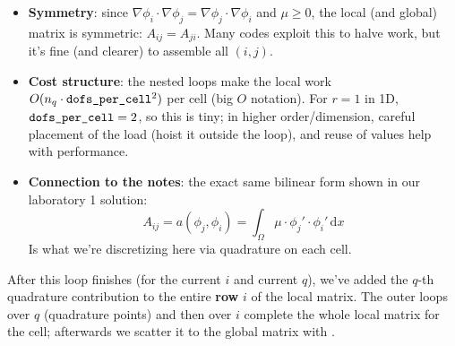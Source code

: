 \begin{itemize}
\begin{itemize}
        \item \textbf{Symmetry}: since $\nabla\phi_i\cdot\nabla\phi_j = \nabla\phi_j\cdot\nabla\phi_i$ and $\mu\ge 0$, the local (and global) matrix is symmetric: $A_{ij}=A_{ji}$. Many codes exploit this to halve work, but it's fine (and clearer) to assemble all $(i,j)$.

        \item \textbf{Cost structure}: the nested  loops make the local work $O(n_q \cdot \texttt{dofs\_per\_cell}^2)$ per cell (big $O$ notation). For $r=1$ in 1D, $\code{dofs\_}\break\code{per\_cell}=2$, so this is tiny; in higher order/dimension, careful placement of the  load (hoist it outside the  loop), and reuse of  values help with performance.
        
        \item \textbf{Connection to the notes}: the exact same bilinear form shown in our laboratory 1 solution:
        \begin{equation*}
            A_{ij} = a\left(\phi_j,\phi_i\right)=\displaystyle\int_{\Omega} \mu \cdot \phi_{j}' \cdot \phi_{i}'\,\mathrm{d}x
        \end{equation*}
        Is what we're discretizing here via quadrature on each cell.
    \end{itemize}
    After this  loop finishes (for the current $i$ and current $q$), we've added the $q$-th quadrature contribution to the entire \textbf{row} $i$ of the local matrix. The outer loops over $q$ (quadrature points) and then over $i$ complete the whole local matrix for the cell; afterwards we scatter it to the global matrix with .



\end{itemize}
